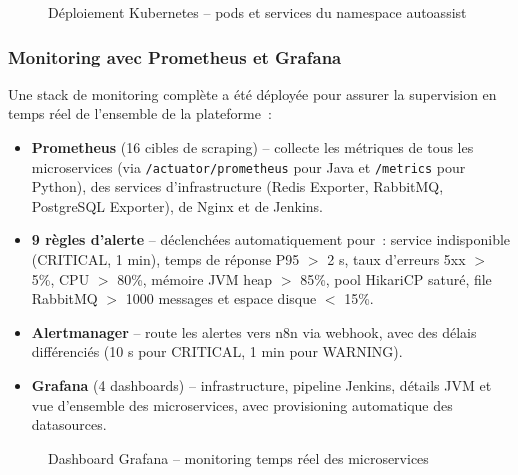 \begin{figure}[H]
    \centering
    \caption{D\'{e}ploiement Kubernetes -- pods et services du namespace autoassist}
    \label{fig:kubernetes}
\end{figure}

\subsubsection{Monitoring avec Prometheus et Grafana}

Une stack de monitoring compl\`{e}te a \'{e}t\'{e} d\'{e}ploy\'{e}e pour assurer la supervision en temps r\'{e}el de l'ensemble de la plateforme~:

\begin{itemize}
    \item \textbf{Prometheus} (16 cibles de scraping) -- collecte les m\'{e}triques de tous les microservices (via \texttt{/actuator/prometheus} pour Java et \texttt{/metrics} pour Python), des services d'infrastructure (Redis Exporter, RabbitMQ, PostgreSQL Exporter), de Nginx et de Jenkins.
    \item \textbf{9 r\`{e}gles d'alerte} -- d\'{e}clench\'{e}es automatiquement pour~: service indisponible (CRITICAL, 1 min), temps de r\'{e}ponse P95 $>$ 2 s, taux d'erreurs 5xx $>$ 5\%, CPU $>$ 80\%, m\'{e}moire JVM heap $>$ 85\%, pool HikariCP satur\'{e}, file RabbitMQ $>$ 1000 messages et espace disque $<$ 15\%.
    \item \textbf{Alertmanager} -- route les alertes vers n8n via webhook, avec des d\'{e}lais diff\'{e}renci\'{e}s (10 s pour CRITICAL, 1 min pour WARNING).
    \item \textbf{Grafana} (4 dashboards) -- infrastructure, pipeline Jenkins, d\'{e}tails JVM et vue d'ensemble des microservices, avec provisioning automatique des datasources.
\end{itemize}

\begin{figure}[H]
    \centering
    \caption{Dashboard Grafana -- monitoring temps r\'{e}el des microservices}
    \label{fig:grafana}
\end{figure}



